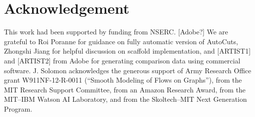 
\section*{Acknowledgement}

This work had been supported by funding from NSERC. [Adobe?] We are grateful to Roi Poranne for guidance on fully automatic version of AutoCuts, Zhongshi Jiang for helpful discussion on scaffold implementation, and [ARTIST1] and [ARTIST2] from Adobe for generating comparison data using commercial software. J. Solomon acknowledges the generous support of Army Research Office grant W911NF-12-R-0011 (``Smooth Modeling of Flows on Graphs''), from the MIT Research Support Committee, from an Amazon Research Award, from the MIT--IBM Watson AI Laboratory, and from the Skoltech--MIT Next Generation Program.